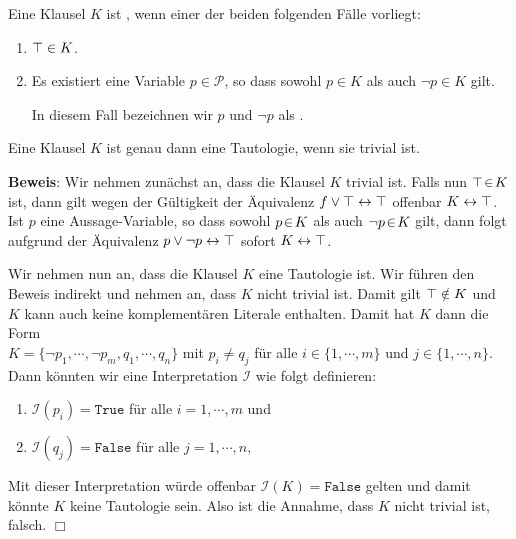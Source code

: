 \begin{Definition}
  Eine Klausel $K$ ist , wenn einer der beiden folgenden Fälle vorliegt:
  \begin{enumerate}
  \item $\top \in K$.
  \item Es existiert eine Variable $p \in \mathcal{P}$, so dass sowohl $p \in K$ als auch $\neg p \in K$ gilt.

        In diesem Fall bezeichnen wir $p$ und $\neg p$ als .
        \eox
\end{enumerate}
\end{Definition}

\begin{Satz} \label{satz:trivial}
  Eine Klausel $K$ ist genau dann eine Tautologie, wenn sie trivial ist.
\end{Satz}
\textbf{Beweis}:  Wir nehmen zunächst an, dass die Klausel $K$ trivial ist.
Falls nun $\top \!\in\! K$ ist, dann gilt wegen der Gültigkeit der Äquivalenz 
$f \vee \top \leftrightarrow \top$
offenbar $K \leftrightarrow \top$.   Ist $p$ eine Aussage-Variable, so dass
sowohl $p \!\in\! K$ als auch $\neg p \!\in\! K$ gilt, dann folgt aufgrund der Äquivalenz $p \vee
\neg p \leftrightarrow \top$ sofort $K \leftrightarrow \top$.

Wir nehmen nun an, dass die Klausel $K$ eine Tautologie ist.  Wir führen den Beweis
indirekt und nehmen an, dass $K$ nicht trivial ist.  Damit gilt  $\top \notin K$ und
$K$ kann auch keine komplementären Literale enthalten.  Damit hat $K$ dann die Form
\\[0.2cm]
\hspace*{1.3cm} 
$K = \{ \neg p_1, \cdots, \neg p_m, q_1, \cdots, q_n \}$ \quad mit $p_i
\not= q_j$ für alle $i \in \{ 1,\cdots,m\}$ und $j \in \{1, \cdots, n\}$.
\\[0.2cm]
Dann könnten wir eine Interpretation $\mathcal{I}$ wie folgt definieren:
\begin{enumerate}
\item $\mathcal{I}(p_i) = \texttt{True}$ für alle $i = 1, \cdots, m$ und
\item $\mathcal{I}(q_j) = \texttt{False}$ für alle $j = 1, \cdots, n$,
\end{enumerate}
Mit dieser Interpretation würde offenbar $\mathcal{I}(K) = \texttt{False}$ gelten und damit könnte $K$ keine
Tautologie sein.  Also ist die Annahme, dass $K$ nicht trivial ist, falsch.
\hspace*{\fill}  $\Box$

